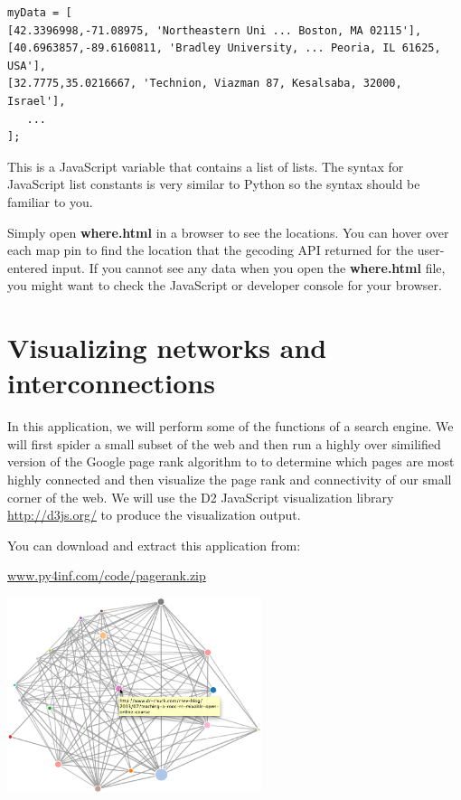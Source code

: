 \documentclass[11pt]{book}
\begin{document}
\beforeverb
\begin{verbatim}
myData = [
[42.3396998,-71.08975, 'Northeastern Uni ... Boston, MA 02115'],
[40.6963857,-89.6160811, 'Bradley University, ... Peoria, IL 61625, USA'],
[32.7775,35.0216667, 'Technion, Viazman 87, Kesalsaba, 32000, Israel'],
   ...
];
\end{verbatim}
\afterverb
%
This is a JavaScript variable that contains a list of lists.  
The syntax for JavaScript list constants is very similar to 
Python so the syntax should be familiar to you.

Simply open {\bf where.html} in a browser to see the locations.  You 
can hover over each map pin to find the location that the 
gecoding API returned for the user-entered input.  If you 
cannot see any data when you open the {\bf where.html} file, you might 
want to check the JavaScript or developer console for your browser.

\section{Visualizing networks and interconnections}

In this application, we will perform some of the functions of a search
engine.   We will first spider a small subset of the web and then run
a highly over similified version of the Google page rank algorithm to
to determine which pages are most highly connected and then visualize
the page rank and connectivity of our small corner of the web.
We will use the D2 JavaScript visualization library 
\url{http://d3js.org/} to produce the visualization output.

You can download and extract this application from:

\url{www.py4inf.com/code/pagerank.zip}

\beforefig
\centerline{\includegraphics[height=2.25in]{figs2/pagerank.eps}}
\afterfig
\end{document}

